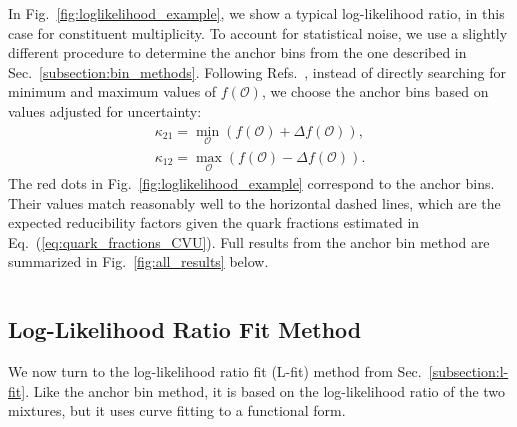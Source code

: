 \documentclass[aps,prd,twocolumn,preprintnumbers,nofootinbib,longbibliography,floatfix]{revtex4-1}
\DeclareRobustCommand{\Sec}[1]{Sec.~\ref{#1}}
\DeclareRobustCommand{\Fig}[1]{Fig.~\ref{#1}}
\DeclareRobustCommand{\Eq}[1]{Eq.~(\ref{#1})}
\DeclareRobustCommand{\Refs}[1]{Refs.~\cite{#1}}
\newcommand{\figO}{\mathcal{O}}
\begin{document}
In \Fig{fig:loglikelihood_example}, we show a typical log-likelihood ratio, in this case for constituent multiplicity.
%
To account for statistical noise, we use a slightly different procedure to determine the anchor bins from the one described in \Sec{subsection:bin_methods}.
%
Following \Refs{Metodiev:2018ftz,Komiske:2018vkc}, instead of directly searching for minimum and maximum values of $f(\figO)$, we choose the anchor bins based on values adjusted for uncertainty:
%
\begin{align}
	\kappa_{21} = \min_\figO \left(f(\figO)+\Delta f(\figO)\right), \\
	\kappa_{12} = \max_\figO \left(f(\figO)-\Delta f(\figO)\right).
\end{align}
%
The red dots in \Fig{fig:loglikelihood_example} correspond to the anchor bins.
%
Their values match reasonably well to the horizontal dashed lines, which are the expected reducibility factors given the quark fractions estimated in \Eq{eq:quark_fractions_CVU}.
%
Full results from the anchor bin method are summarized in \Fig{fig:all_results} below.



\begin{figure*}[t]
	$\quad$
	
	\caption{Demonstration of the L-fit method on the CMS 2011 Open Data with central value unfolding.
	(a) The same likelihood ratio as \Fig{fig:loglikelihood_example} but now fit to a $K = 7$ degree polynomial.  The anchor values (red) are at the extrema of the fitted curve.
	(b) Extracted anchor values as a function of the degree of the fit polynomial.  The red point indicates the optimum determined from the AIC in \Eq{eq:chi2_lfit}.
	The error bars correspond to statistical uncertainties only.
	}
	\label{fig:Lfit_example}
\end{figure*}



\subsection{Log-Likelihood Ratio Fit Method}
\label{sec:lfit}


We now turn to the log-likelihood ratio fit (L-fit) method from \Sec{subsection:l-fit}.
%
Like the anchor bin method, it is based on the log-likelihood ratio of the two mixtures, but it uses curve fitting to a functional form.
\end{document}
